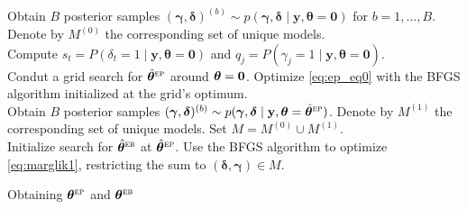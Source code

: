 \documentclass[12pt]{article}
\newcommand{\mb}[1]{\mathbf{#1}}
\newcommand{\by}{{\mb{y}}}
\newcommand{\bgamma}{{\bm{\gamma}}}
\newcommand{\bdelta}{{\bm{\delta}}}
\newcommand{\btheta}{{\bm{\theta}}}
\newcommand{\bthetaeb}{\btheta^{\textsc{eb}}}
\newcommand{\bthetaep}{\btheta^{\textsc{ep}}}
\newcommand{\hthetaeb}{\hat{\btheta}^{\textsc{eb}}}
\newcommand{\hthetaep}{\hat{\btheta}^{\textsc{ep}}}
\begin{document}
\begin{algorithm}[H] \label{alg:one}
\KwOut{$\hthetaep$ and $\hthetaeb$}
Obtain $B$ posterior samples $(\bgamma, \bdelta)^{(b)} \sim p(\bgamma, \bdelta \mid \by, \btheta = \mb{0})$ for $b = 1,\ldots,B$. Denote by $M^{(0)}$ the corresponding set of unique models.\\

Compute $s_{t} = P(\delta_{t} = 1 \mid \by, \btheta = \mb{0})$ and $q_{j} = P(\gamma_{j} = 1 \mid \by, \btheta = \mb{0})$.\\


Condut a grid search for $\hthetaep$ around $\btheta={\bf 0}$. Optimize \eqref{eq:ep_eq0} with the BFGS algorithm initialized at the grid's optimum.\\

Obtain $B$ posterior samples $(\bgamma, \bdelta)^{(b)} \sim p(\bgamma, \bdelta \mid \by, \btheta = \hthetaep)$. Denote by $M^{(1)}$ the corresponding set of unique models. Set $M = M^{(0)} \cup M^{(1)}$.\\

Initialize search for $\hthetaeb$ at $\hthetaep$. Use the BFGS algorithm to optimize \eqref{eq:marglik1}, restricting the sum to $(\bdelta,\bgamma) \in M$.
\caption{Obtaining $\bthetaep$ and $\bthetaeb$}
\end{algorithm}

\begin{comment}

\begin{algorithm}[H] \label{alg:one}
\SetAlgoLined
\KwResult{$\hthetaep$ and/or $\hthetaeb$}
 \STATE Set $\btheta = \mb{0}$ and obtain $B$ posterior samples $(\gamma,\delta)^{(b)} \sim p(\bgamma, \bdelta \mid \by, \btheta = \mb{0})$ for $b = 1,\ldots,B$. Denote by $M^{(0)}$ the corresponding set of unique models. $M^{(0)}$\;
 Compute estimates $\hat{q}_{j} = \sum_{(\bdelta, \bgamma): \gamma_j = 1; (\bdelta, \bgamma) \in M^{(0)}} p(\bdelta, \bgamma \mid \by, \btheta = \mb{0})$\;
 Approximate the optimum of (log) objective function in \eqref{eq:ep_eq0} $\longrightarrow \hthetaep$\;
 Conduct new model search conditional on $\btheta = \hthetaep$, visiting models $M^{(1)}$\;
 Set $M = M^{(0)} \cup M^{(1)}$, precompute and store $p(\by \mid \bdelta, \bgamma)$ for every $(\bdelta, \bgamma) \in M$\;
 Apply BFGS method on (log) objective function initialised at $\btheta = \hthetaep$\;
 Return the optimum found by BFGS $\longrightarrow \hthetaeb$\;
 \caption{Quick approximation to $\bthetaeb$}
\end{algorithm}

\end{comment}
\end{document}
